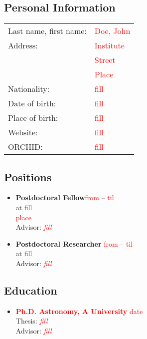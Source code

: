 \subsection*{Personal Information}
\begin{tabular}{p{5cm}l}
Last name, first name:		& \textcolor{red}{Doe, John}\\[0.1cm]
Address:					& \textcolor{red}{Institute}\\
							& \textcolor{red}{Street}\\
							& \textcolor{red}{Place}\\[0.1cm]
Nationality:				& \textcolor{red}{fill}\\[0.1cm]
Date of birth:				& \textcolor{red}{fill}\\[0.1cm]
Place of birth:				& \textcolor{red}{fill}\\[0.1cm]
Website:					& \textcolor{red}{fill}\\[0.1cm]
ORCHID:						& \textcolor{red}{fill}
\end{tabular}

\subsection*{Positions}
\begin{itemize}
\item \textbf{Postdoctoral Fellow}\hfill \textcolor{red}{from} -- \textcolor{red}{til}\\
					at \textcolor{red}{fill}\\
					\textcolor{red}{place}\\
					Advisor: \textit{\textcolor{red}{fill}}\\[-0.75em]
\item \textbf{Postdoctoral Researcher} \hfill \textcolor{red}{from} -- \textcolor{red}{til}	\\
					at \textcolor{red}{fill}\\
					Advisor: \textit{\textcolor{red}{fill}}
\end{itemize}

\subsection*{Education}
\begin{itemize}
\item \textbf{\textcolor{red}{Ph.D. Astronomy, A University}}		 \hfill \textcolor{red}{date}\\
	Thesis: \textit{\textcolor{red}{fill}}\\
	Advisor: \textit{\textcolor{red}{fill}}\\[-0.75em]
\end{itemize}
	
